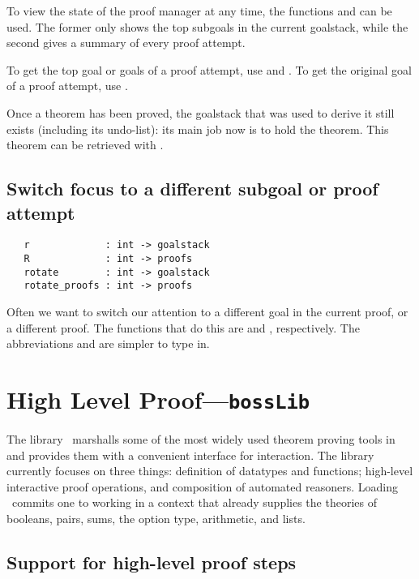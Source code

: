 To view the state of the proof manager at any time, the functions
 and  can be used. The former only shows
the top subgoals in the current goalstack, while the second gives a
summary of every proof attempt.

To get the top goal or goals of a proof attempt, use 
and . To get the original goal of a proof attempt,
use .

Once a theorem has been proved, the goalstack that was used to derive it
still exists (including its undo-list): its main job now is to
hold the theorem. This theorem can be retrieved with
.

\subsection{Switch focus to a different subgoal or proof attempt}

\begin{verbatim}
   r             : int -> goalstack
   R             : int -> proofs
   rotate        : int -> goalstack
   rotate_proofs : int -> proofs
\end{verbatim}

Often we want to switch our attention to a different goal in the current
proof, or a different proof. The functions that do this are
 and , respectively. The abbreviations
 and  are simpler to type in.

\section{High Level Proof---\texttt{bossLib}}
\label{sec:bossLib}
\newcommand\bossLib{\ml{bossLib}}

The library \bossLib\ marshalls some of the most widely used theorem
proving tools in \HOL{} and provides them with a convenient interface
for interaction. The library currently focuses on three things:
definition of datatypes and functions; high-level interactive proof
operations, and composition of automated reasoners. Loading \bossLib\
commits one to working in a context that already supplies the theories
of booleans, pairs, sums, the option type, arithmetic, and lists.


\subsection{Support for high-level proof steps}
\label{sec:high-level-proof-steps}

